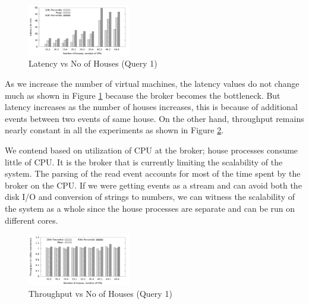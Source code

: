 \begin{figure}[h]
\begin{center}
	\includegraphics[width=0.4\textwidth]{img/q1_latency}
	\vspace*{-0.4cm}
	\caption{Latency vs No of Houses (Query 1) \label{fig:q1_latency}}
\end{center}
\vspace*{-0.3cm}
\end{figure}

As we increase the number of virtual machines, the latency values do not change much as shown in Figure \ref{fig:q1_latency} because the broker becomes the bottleneck. But latency increases as the number of houses increases, this is because of additional events between two events of same house. On the other hand, throughput remains nearly constant in all the experiments as shown in Figure \ref{fig:q1_throughput}.

We contend based on utilization of CPU at the broker; house processes consume little of CPU. It is the broker that is currently limiting the scalability of the system. The parsing of the read event accounts for most of the time spent by the broker on the CPU.
If we were getting events as a stream and can avoid both the disk I/O and conversion of strings to numbers, we can witness the scalability of the system as a whole since the house processes are separate and can be run on different cores.

\begin{figure}[h]
\begin{center}
	\includegraphics[width=0.4\textwidth]{img/q1_throughput}
	\vspace*{-0.4cm}
	\caption{Throughput vs No of Houses (Query 1)\label{fig:q1_throughput}}
\end{center}
\vspace*{-0.4cm}
\end{figure}
